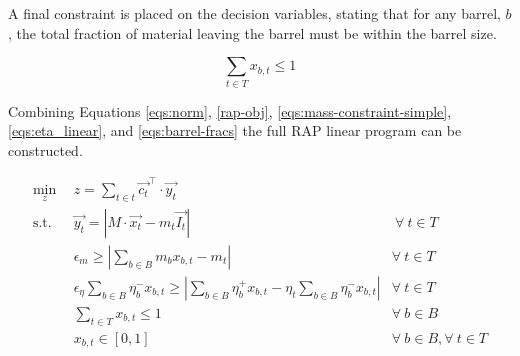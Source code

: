 A final constraint is placed on the decision variables, stating that for any
barrel, $b$, the total fraction of material leaving the barrel must be within
the barrel size.

\begin{equation}
\label{eqs:barrel-fracs}
\sum_{t \in T} x_{b, t} \leq 1
\end{equation}

Combining Equations \ref{eqs:norm}, \ref{rap-obj}, 
\ref{eqs:mass-constraint-simple}, \ref{eqs:eta_linear}, and
\ref{eqs:barrel-fracs} the full RAP linear program can be constructed.

\begin{subequations}\label{eqs:rap}
  \begin{align}
    \min_{z} \:\: & 
    z = \sum_{t \in t} \vec{c_{t}}^{\top} \cdot \vec{y_{t}}
    & \label{eqs:rap_obj} \\
    \text{s.t.} \:\: &
    \vec{y_{t}} = \left| M \cdot \vec{x_{t}}  - m_t \vec{I_{t}} \right|
    &
    \: \forall \: t \in T \label{eqs:rap_iso} \\
    &
    \epsilon_{m} \geq \left| \sum_{b \in B} m_{b} x_{b, t} - m_{t} \right|
    & 
    \forall \: t \in T \label{eqs:rap_mass} \\
    &
    \epsilon_{\eta} \sum_{b \in B} \eta_{b}^{-} x_{b, t} \geq 
    \left| \sum_{b \in B} \eta_{b}^{+} x_{b, t} - 
           \eta_{t} \sum_{b \in B} \eta_{b}^{-} x_{b, t} \right|
    & 
    \forall \: t \in T \label{eqs:rap_eta} \\
    &
    \sum_{t \in T} x_{b, t} \leq 1
    & 
    \forall \: b \in B \label{eqs:rap_conserv} \\
    &
    x_{b, t} \in \left[ 0, 1 \right]
    & 
    \forall \: b \in B, \forall \: t \in T  \label{eqs:rap_x}
  \end{align}
\end{subequations}

